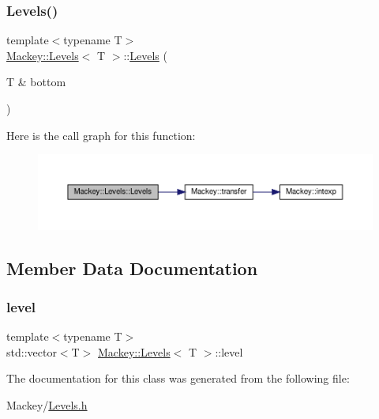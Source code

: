 \subsubsection{\texorpdfstring{Levels()}{Levels()}}
{\footnotesize\ttfamily template$<$typename T$>$ \\
\hyperlink{classMackey_1_1Levels}{Mackey\+::\+Levels}$<$ T $>$\+::\hyperlink{classMackey_1_1Levels}{Levels} (\begin{DoxyParamCaption}\item[{T \&}]{bottom }\end{DoxyParamCaption})\hspace{0.3cm}{\ttfamily [inline]}}

Here is the call graph for this function\+:\nopagebreak
\begin{figure}[H]
\begin{center}
\leavevmode
\includegraphics[width=350pt]{classMackey_1_1Levels_a450b9aba828f03dd340e89169a4bd9e0_cgraph}
\end{center}
\end{figure}


\subsection{Member Data Documentation}
\mbox{\label{classMackey_1_1Levels_af9a1391f683685ae464829b9b32162c8}} 
\subsubsection{\texorpdfstring{level}{level}}
{\footnotesize\ttfamily template$<$typename T$>$ \\
std\+::vector$<$T$>$ \hyperlink{classMackey_1_1Levels}{Mackey\+::\+Levels}$<$ T $>$\+::level}



The documentation for this class was generated from the following file\+:\begin{DoxyCompactItemize}
\item 
Mackey/\hyperlink{Levels_8h}{Levels.\+h}\end{DoxyCompactItemize}

